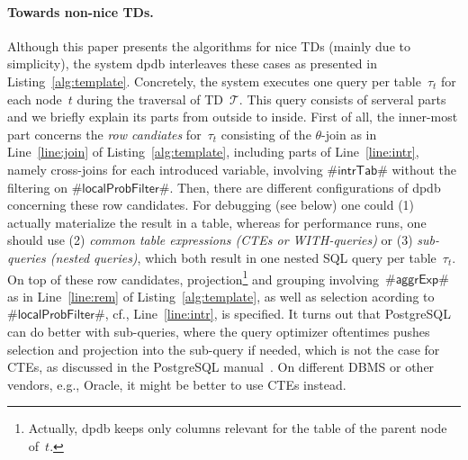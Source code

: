 \documentclass{llncs}
\newcommand{\dpdb}{{\small\textsf{dpdb}}\xspace}
\newcommand{\tab}[1]{\ensuremath{\tau_{#1}}}
\begin{document}
\paragraph*{Towards non-nice TDs.}
Although this paper presents the algorithms for nice TDs (mainly due to simplicity),
the system \dpdb interleaves these cases as presented in 
Listing~\ref{alg:template}.
Concretely, the system executes one query per table~$\tab{t}$ for each node~$t$ during the traversal of TD~$\mathcal{T}$. 
This query consists of serveral parts and we briefly explain its parts from outside to inside. 
First of all, the inner-most part concerns the \emph{row candiates} for~$\tab{t}$ consisting of the $\theta$-join as in Line~\ref{line:join} of Listing~\ref{alg:template}, including parts of Line~\ref{line:intr}, namely cross-joins for each introduced variable, involving $\#\mathsf{intrTab}\#$ without the filtering on $\#\mathsf{localProbFilter}\#$.
Then, there are different configurations of \dpdb concerning these row candidates.
For debugging (see below) one could (1) actually materialize the result in a table,
whereas for performance runs, one should use (2) \emph{common table expressions (CTEs or {\ttfamily WITH}-queries)} or (3) \emph{sub-queries (nested queries)}, which both result in one nested SQL query per table~$\tab{t}$. 
On top of these row candidates, projection\footnote{Actually, \dpdb keeps only columns relevant for the table of the parent node of~$t$.} and grouping involving~$\#\mathsf{aggrExp}\#$ as in Line~\ref{line:rem} of Listing~\ref{alg:template}, as well as selection acording to~$\#\mathsf{localProbFilter}\#$, cf., Line~\ref{line:intr}, is specified.
It turns out that PostgreSQL can do better with sub-queries, where the query optimizer
oftentimes pushes selection and projection into the sub-query if needed, which
is not the case for CTEs, as discussed in the PostgreSQL manual~\cite[Sec. 7.8.1]{postgres}. On different DBMS or other vendors, e.g., Oracle, it might be better to use CTEs instead.
\end{document}

